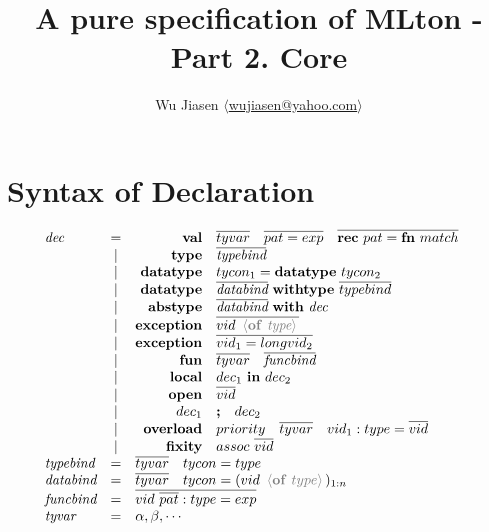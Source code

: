 \documentclass[11pt,a4paper]{article}
\newcommand{\key}[1]{\textrm{\textbf{#1}}}
\newcommand{\prodlhs}[1]{\textit{#1}}
\newcommand{\angled}[1]{\,{\color{gray}\langle#1\rangle}\,}
\begin{document}
\title {A pure specification of MLton - Part 2. Core}
\author{Wu Jiasen $\langle$\href{mailto:wujiasen@yahoo.com}{wujiasen@yahoo.com}$\rangle$}
\maketitle 

\section{Syntax of Declaration}
{\renewcommand{\arraystretch}{1.2}\[
\begin{array}{lcrll}
\prodlhs{dec}
     & = & \key{val}  	  & \overline{tyvar} \quad \overline{pat = exp} \quad \overline{\key{rec}\ pat = \key{fn}\ match} &\\
     & | & \key{type} 	  & \overline{\prodlhs{typebind}}                                &\\
     & | & \key{datatype} & tycon_1 = \key{datatype}\ tycon_2                            &\\
     & | & \key{datatype} & \overline{\prodlhs{databind}} \ \key{withtype}\ \overline{typebind} &\\
     & | & \key{abstype}  & \overline{\prodlhs{databind}} \ \key{with}\ \prodlhs{dec}      &\\
     & | & \key{exception}& \overline{vid\ \angled{\key{of}\ \prodlhs{type}}}   &\\
     & | & \key{exception}& \overline{vid_1 = longvid_2}               &\\
     & | & \key{fun}      & \overline{tyvar} \quad \overline{\prodlhs{funcbind}} &\\
     & | & \key{local}    & \prodlhs{$dec_1$} \ \key{in}\ \prodlhs{$dec_2$}     &\\
     & | & \key{open}     & \overline{vid}                          	&\\
     & | & \prodlhs{$dec_1$} & \key{;}\quad \prodlhs{$dec_2$} &\\
     & | & \key{overload} & priority \quad \overline{tyvar} \quad vid_1:type=\overline{vid}&\\
     & | & \key{fixity}   & assoc\ \overline{vid}                      &\\
\prodlhs{typebind} 
     & = & \multicolumn{2}{l}{\overline{tyvar} \quad tycon = type } 		&\\
\prodlhs{databind}
	 & = & \multicolumn{2}{l}{\overline{tyvar} \quad tycon = (vid \ \angled{\key{of}\ type})_{1:n} } 		&\\
\prodlhs{funcbind}
	 & = & \multicolumn{2}{l}{\overline{vid \ \overline{pat}:type = exp}} &\\
\prodlhs{tyvar}
     & = & \multicolumn{2}{l}{\alpha,\beta,\cdots} &\\
\end{array}
\]}
\end{document}
